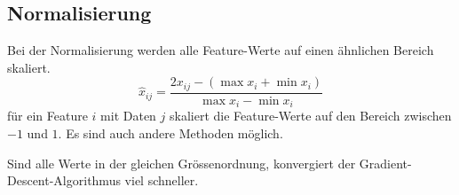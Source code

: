 \subsection{Normalisierung}

Bei der Normalisierung werden alle Feature-Werte auf einen ähnlichen Bereich skaliert.
\begin{equation}
    \hat x_{ij} = \frac{2x_{ij} - (\max x_i + \min x_i)}{\max x_i - \min x_i}
\end{equation}
für ein Feature $i$ mit Daten $j$ skaliert die Feature-Werte auf den Bereich zwischen $-1$
und $1$. Es sind auch andere Methoden möglich.

Sind alle Werte in der gleichen Grössenordnung, konvergiert der
Gradient-Descent-Algorithmus viel schneller.
